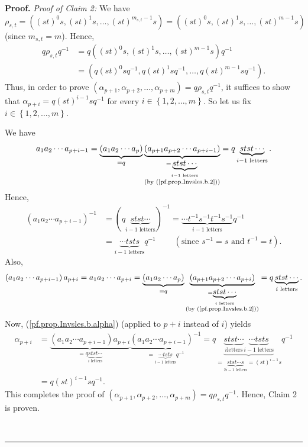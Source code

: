 \documentclass
[numbers=enddot,12pt,final,onecolumn,notitlepage,abstracton]{scrartcl}%
\theoremstyle{definition}
\newenvironment{proof}[1][Proof]{\noindent\textbf{#1.} }{\ \rule{0.5em}{0.5em}}
\begin{document}
\begin{proof}
\textit{Proof of Claim 2:} We have%
\[
\rho_{s,t}=\left(  \left(  st\right)  ^{0}s,\left(  st\right)  ^{1}%
s,\ldots,\left(  st\right)  ^{m_{s,t}-1}s\right)  =\left(  \left(  st\right)
^{0}s,\left(  st\right)  ^{1}s,\ldots,\left(  st\right)  ^{m-1}s\right)
\]
(since $m_{s,t}=m$). Hence,%
\begin{align*}
q\rho_{s,t}q^{-1}  &  =q\left(  \left(  st\right)  ^{0}s,\left(  st\right)
^{1}s,\ldots,\left(  st\right)  ^{m-1}s\right)  q^{-1}\\
&  =\left(  q\left(  st\right)  ^{0}sq^{-1},q\left(  st\right)  ^{1}%
sq^{-1},\ldots,q\left(  st\right)  ^{m-1}sq^{-1}\right)  .
\end{align*}
Thus, in order to prove $\left(  \alpha_{p+1},\alpha_{p+2},\ldots,\alpha
_{p+m}\right)  =q\rho_{s,t}q^{-1}$, it suffices to show that $\alpha
_{p+i}=q\left(  st\right)  ^{i-1}sq^{-1}$ for every $i\in\left\{
1,2,\ldots,m\right\}  $. So let us fix $i\in\left\{  1,2,\ldots,m\right\}  $.

We have%
\[
a_{1}a_{2}\cdots a_{p+i-1}=\underbrace{\left(  a_{1}a_{2}\cdots a_{p}\right)
}_{=q}\underbrace{\left(  a_{p+1}a_{p+2}\cdots a_{p+i-1}\right)
}_{\substack{=\underbrace{stst\cdots}_{i-1\text{ letters}}\\\text{(by
(\ref{pf.prop.Invsles.b.2}))}}}=q\underbrace{stst\cdots}_{i-1\text{ letters}%
}.
\]
Hence,%
\begin{align*}
\left(  a_{1}a_{2}\cdots a_{p+i-1}\right)  ^{-1}  &  =\left(
q\underbrace{stst\cdots}_{i-1\text{ letters}}\right)  ^{-1}=\underbrace{\cdots
t^{-1}s^{-1}t^{-1}s^{-1}}_{i-1\text{ letters}}q^{-1}\\
&  =\underbrace{\cdots tsts}_{i-1\text{ letters}}q^{-1}%
\ \ \ \ \ \ \ \ \ \ \left(  \text{since }s^{-1}=s\text{ and }t^{-1}=t\right)
.
\end{align*}
Also,%
\[
\left(  a_{1}a_{2}\cdots a_{p+i-1}\right)  a_{p+i}=a_{1}a_{2}\cdots
a_{p+i}=\underbrace{\left(  a_{1}a_{2}\cdots a_{p}\right)  }_{=q}%
\underbrace{\left(  a_{p+1}a_{p+2}\cdots a_{p+i}\right)  }%
_{\substack{=\underbrace{stst\cdots}_{i\text{ letters}}\\\text{(by
(\ref{pf.prop.Invsles.b.2}))}}}=q\underbrace{stst\cdots}_{i\text{ letters}}.
\]
Now, (\ref{pf.prop.Invsles.b.alpha}) (applied to $p+i$ instead of $i$) yields%
\begin{align*}
\alpha_{p+i}  &  =\underbrace{\left(  a_{1}a_{2}\cdots a_{p+i-1}\right)
a_{p+i}}_{=q\underbrace{stst\cdots}_{i\text{ letters}}}\underbrace{\left(
a_{1}a_{2}\cdots a_{p+i-1}\right)  ^{-1}}_{=\underbrace{\cdots tsts}%
_{i-1\text{ letters}}q^{-1}}=q\underbrace{\underbrace{stst\cdots}_{i\text{
letters}}\underbrace{\cdots tsts}_{i-1\text{ letters}}}%
_{=\underbrace{stst\cdots s}_{2i-1\text{ letters}}=\left(  st\right)  ^{i-1}%
s}q^{-1}\\
&  =q\left(  st\right)  ^{i-1}sq^{-1}.
\end{align*}
This completes the proof of $\left(  \alpha_{p+1},\alpha_{p+2},\ldots
,\alpha_{p+m}\right)  =q\rho_{s,t}q^{-1}$. Hence, Claim 2 is proven.


\end{proof}
\end{document}
